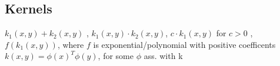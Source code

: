 \subsection*{Kernels}








%
$k_1(x,y) + k_2(x,y)$ , 
$k_1(x,y) \cdot k_2(x,y)$, 
$c \cdot k_1(x,y)$ for $c>0$ , 
$f(k_1(x,y))$, where $f$ is exponential/polynomial with positive coefficents\\
$k(x,y) = \phi(x)^T \phi(y)$, for some $\phi$ ass. with k

